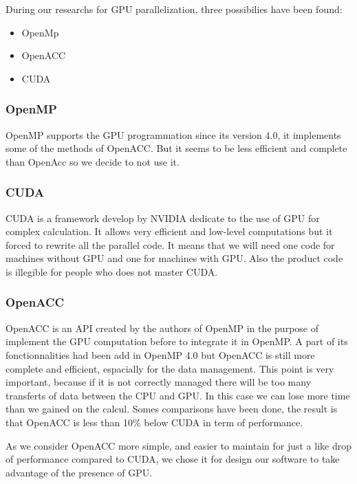 During our researchs for GPU parallelization, three possibilies have been found:
\begin{itemize}
\item OpenMp
\item OpenACC
\item CUDA
\end{itemize}


\subsubsection{OpenMP}
OpenMP supports the GPU programmation since its version 4.0, it implements some of the methods of OpenACC. But it seems to be less efficient and complete than OpenAcc so we decide to not use it.

\subsubsection{CUDA}
CUDA is a framework develop by NVIDIA dedicate to the use of GPU for complex calculation. It allows very efficient and low-level computations but it forced to rewrite all the parallel code. It means that we will need one code for machines without GPU and one for machines with GPU. Also the product code is illegible for people who does not master CUDA.

\subsubsection{OpenACC}
OpenACC is an API created by the authors of OpenMP in the purpose of implement the GPU computation before to integrate it in OpenMP. A part of its fonctionnalities had been add in OpenMP 4.0 but OpenACC is still more complete and efficient, espacially for the data management. This point is very important, because if it is not correctly managed there will be too many transferts of data between the CPU and GPU. In this case we can lose more time than we gained on the calcul. Somes comparisons have been done, the result is that OpenACC is less than 10\% below CUDA in term of performance. 

As we consider OpenACC more simple, and easier to maintain for just a like drop of performance compared to CUDA, we chose it for design our software to take advantage of the presence of GPU.